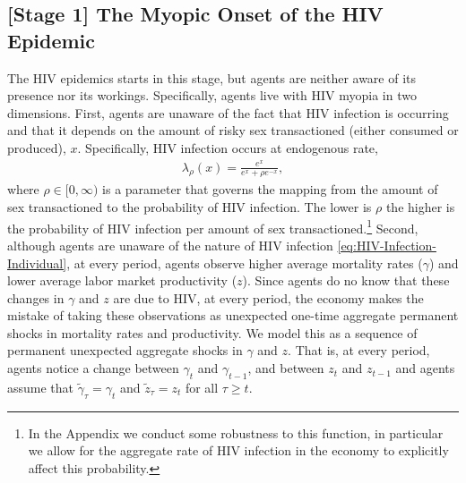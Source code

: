 \subsection*{[Stage 1] The Myopic Onset of the HIV Epidemic}\label{sec:stage1}

The HIV epidemics starts in this stage, but agents are neither aware of its presence nor its workings. Specifically, agents live with HIV myopia in two dimensions. First, agents are unaware of the fact that HIV infection is occurring and that it depends on the amount of risky sex transactioned (either consumed or produced), $x$. Specifically, HIV infection occurs at endogenous rate,
\begin{align}\label{eq:HIV-Infection-Individual}
    \lambda_\rho(x)=\frac{e^{x}}{e^{x}+\rho e^{-x}},
\end{align}
where $\rho \in [0,\infty)$ is a parameter that governs the mapping from the amount of sex transactioned to the probability of HIV infection. The lower is $\rho$ the higher is the probability of HIV infection per amount of sex transactioned.\footnote{\sf In the Appendix we conduct some robustness to this function, in particular we allow for the aggregate rate of HIV infection in the economy to explicitly affect this probability.} %
Second, although agents are unaware of the nature of HIV infection \eqref{eq:HIV-Infection-Individual}, at every period, agents observe higher average mortality rates ($\gamma$) and lower average labor market productivity ($z$). Since agents do no know that these changes in $\gamma$ and $z$ are due to HIV, at every period, the economy makes the mistake of taking these observations as unexpected one-time aggregate permanent shocks in mortality rates and productivity. We model this as a sequence of permanent unexpected aggregate shocks in $\gamma$ and $z$. That is, at every period, agents notice a change between $\gamma_t$ and $\gamma_{t-1}$, and between $z_t$ and $z_{t-1}$ and agents assume that $\widetilde{\gamma}_\tau=\gamma_t$ and $\widetilde{z}_\tau=z_t$ for all $\tau \geq t$. 


